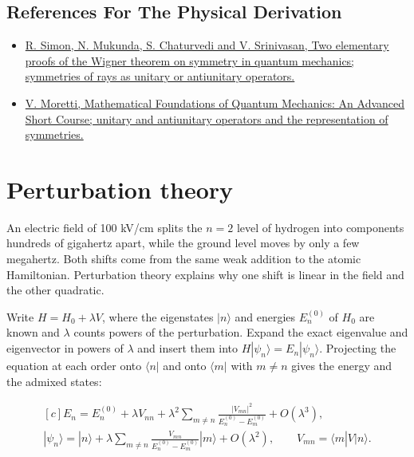 \documentclass[11pt,oneside]{book}
\newenvironment{centeredalign}{\[\begin{gathered}[c]}{\end{gathered}\]}
\begin{document}
\subsection*{References For The Physical Derivation}
\begin{itemize}
\item \href{https://arxiv.org/abs/0808.0779}{R. Simon, N. Mukunda, S. Chaturvedi and V. Srinivasan, Two elementary proofs of the Wigner theorem on symmetry in quantum mechanics; symmetries of rays as unitary or antiunitary operators.}
\item \href{https://arxiv.org/abs/1508.06951}{V. Moretti, Mathematical Foundations of Quantum Mechanics: An Advanced Short Course; unitary and antiunitary operators and the representation of symmetries.}
\end{itemize}





\clearpage

\section{Perturbation theory}

\label{topic:perturbation-theory}

An electric field of 100 kV/cm splits the \(n=2\) level of hydrogen into components hundreds of gigahertz apart, while the ground level moves by only a few megahertz. Both shifts come from the same weak addition to the atomic Hamiltonian. Perturbation theory explains why one shift is linear in the field and the other quadratic.

Write \(H=H_0+\lambda V\), where the eigenstates \(|n\rangle\) and energies \(E_n^{(0)}\) of \(H_0\) are known and \(\lambda\) counts powers of the perturbation. Expand the exact eigenvalue and eigenvector in powers of \(\lambda\) and insert them into \(H|\psi_n\rangle=E_n|\psi_n\rangle\). Projecting the equation at each order onto \(\langle n|\) and onto \(\langle m|\) with \(m\neq n\) gives the energy and the admixed states:

\begin{centeredalign}
E_n=E_n^{(0)}+\lambda V_{nn}
+\lambda^2\sum_{m\neq n}\frac{|V_{mn}|^2}{E_n^{(0)}-E_m^{(0)}}+O(\lambda^3),\\
|\psi_n\rangle=|n\rangle+\lambda\sum_{m\neq n}\frac{V_{mn}}{E_n^{(0)}-E_m^{(0)}}|m\rangle+O(\lambda^2),
\qquad V_{mn}=\langle m|V|n\rangle.
\end{centeredalign}
\end{document}
